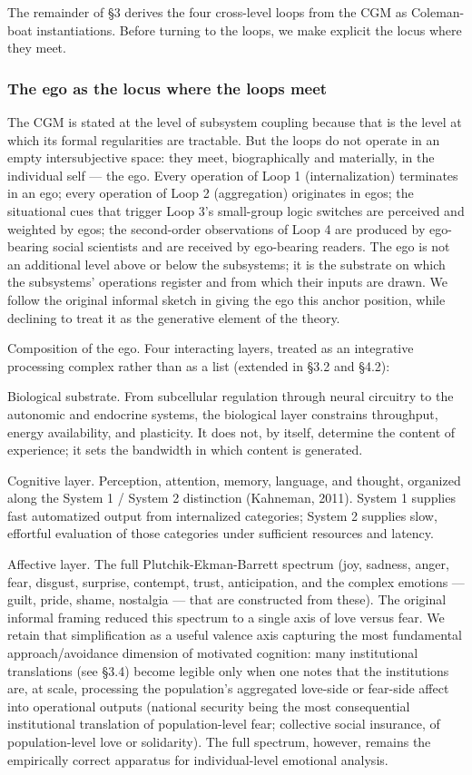\documentclass[12pt,a4paper]{article}
\begin{document}
The remainder of §3 derives the four cross-level loops from the CGM as Coleman-boat instantiations. Before turning to the loops, we make explicit the locus where they meet.

\subsubsection{The ego as the locus where the loops meet}

The CGM is stated at the level of subsystem coupling because that is the level at which its formal regularities are tractable. But the loops do not operate in an empty intersubjective space: they meet, biographically and materially, in the individual self --- the ego. Every operation of Loop 1 (internalization) terminates in an ego; every operation of Loop 2 (aggregation) originates in egos; the situational cues that trigger Loop 3's small-group logic switches are perceived and weighted by egos; the second-order observations of Loop 4 are produced by ego-bearing social scientists and are received by ego-bearing readers. The ego is not an additional level above or below the subsystems; it is the substrate on which the subsystems' operations register and from which their inputs are drawn. We follow the original informal sketch in giving the ego this anchor position, while declining to treat it as the generative element of the theory.


Composition of the ego. Four interacting layers, treated as an integrative processing complex rather than as a list (extended in §3.2 and §4.2):


Biological substrate. From subcellular regulation through neural circuitry to the autonomic and endocrine systems, the biological layer constrains throughput, energy availability, and plasticity. It does not, by itself, determine the content of experience; it sets the bandwidth in which content is generated.

Cognitive layer. Perception, attention, memory, language, and thought, organized along the System 1 / System 2 distinction (Kahneman, 2011). System 1 supplies fast automatized output from internalized categories; System 2 supplies slow, effortful evaluation of those categories under sufficient resources and latency.

Affective layer. The full Plutchik-Ekman-Barrett spectrum (joy, sadness, anger, fear, disgust, surprise, contempt, trust, anticipation, and the complex emotions --- guilt, pride, shame, nostalgia --- that are constructed from these). The original informal framing reduced this spectrum to a single axis of love versus fear. We retain that simplification as a useful valence axis capturing the most fundamental approach/avoidance dimension of motivated cognition: many institutional translations (see §3.4) become legible only when one notes that the institutions are, at scale, processing the population's aggregated love-side or fear-side affect into operational outputs (national security being the most consequential institutional translation of population-level fear; collective social insurance, of population-level love or solidarity). The full spectrum, however, remains the empirically correct apparatus for individual-level emotional analysis.
\end{document}
